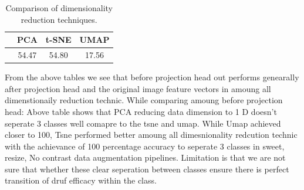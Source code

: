   
\begin{table}[h!]
  \centering
  \begin{tabular}{lccc}
      \toprule
      & \textbf{PCA} & \textbf{t-SNE} & \textbf{UMAP} \\ 
      \midrule
      & 54.47 & 54.80 & 17.56 \\ 
      \bottomrule
  \end{tabular}
  \caption{Comparison of dimensionality reduction techniques.}
  \label{tab:dim_reduction}
\end{table}

From the above tables we see that before projection head out performs genearally after projection head and the original image feature vectors in amoung all dimenstionaily reduction technic.
While comparing amoung before projection head: Above table shows that PCA reducing data dimension to 1 D doesn't seperate 3 classes well comapre to the tsne and umap. While Umap achieved closer to 100, Tsne performed better amoung all dimesnionality redcution technic  with the achievance of 100 percentage accuracy to seperate 3 classes in sweet, resize, No contrast data augmentation pipelines. Limitation is that we are not sure that whether these clear seperation between classes ensure there is perfect transition of druf efficacy within the class.